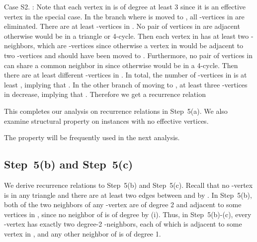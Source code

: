 \documentclass{elsart_TR2}
\begin{document}
Case S2. :
Note that each vertex in  is of degree at least 3 since it is an effective vertex in the special case.
In the branch where  is moved to , all -vertices in  are eliminated.
There are at least  -vertices in . No pair of vertices in  are adjacent otherwise  would be in a triangle or 4-cycle.
Then each vertex in  has at least two -neighbors,
which are -vertices since otherwise a vertex in  would be adjacent to two -vertices
and should have been moved to .
Furthermore, no pair of vertices in  can share a common neighbor in 
since otherwise  would be in a 4-cycle.
Then there are at least  different -vertices in .
In total, the number of -vertices in   is at least , implying that .
In the other branch of moving  to , at least three -vertices in  decrease, implying that .
Therefore we get a recurrence relation


\medskip
This completes our analysis on recurrence relations  in  Step~5(a).
We also examine  structural property on
instances with no effective vertices.


The  property will be frequently used in the next analysis.


\subsection{Step~5(b) and Step~5(c)}
We  derive recurrence relations to Step~5(b) and Step~5(c).
Recall that
no -vertex  is  in any triangle and there are at least two edges between  and  by .
In Step~5(b),  both of the two neighbors of any -vertex  are of degree 2 and
adjacent to some vertices in , since no neighbor of  is of degree  by (i).
Thus, in Step~5(b)-(c), every -vertex  has exactly two degree-2 -neighbors,
each of which is adjacent to some vertex in ,
and any other neighbor of  is of degree 1.
\end{document}
